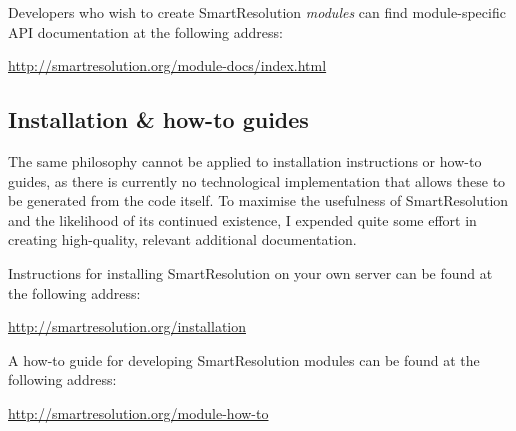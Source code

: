 Developers who wish to create SmartResolution \emph{modules} can find module-specific API documentation at the following address:

\url{http://smartresolution.org/module-docs/index.html}

\subsection{Installation \& how-to guides}

The same philosophy cannot be applied to installation instructions or how-to guides, as there is currently no technological implementation that allows these to be generated from the code itself. To maximise the usefulness of SmartResolution and the likelihood of its continued existence, I expended quite some effort in creating high-quality, relevant additional documentation.

Instructions for installing SmartResolution on your own server can be found at the following address:

\url{http://smartresolution.org/installation}

A how-to guide for developing SmartResolution modules can be found at the following address:

\url{http://smartresolution.org/module-how-to}